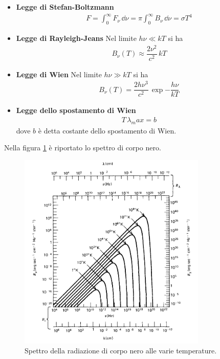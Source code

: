 \begin{itemize}
\item{\textbf{Legge di Stefan-Boltzmann}} \begin{align}
F = \int_0^{\infty} F_\nu \, \dd \nu = \pi \int_0^\infty B_\nu \, \dd \nu = \sigma T^4
\end{align}
\item{\textbf{Legge di Rayleigh-Jeans}} Nel limite $h\nu \ll kT$ si ha
\begin{align}
B_\nu(T) \approx \dfrac{2\nu^2}{c^2}\, kT
\end{align}
\item{\textbf{Legge di Wien}} Nel limite $h\nu \gg kT$ si ha
\begin{align}
B_\nu (T) = \dfrac{2h\nu^3}{c^2} \, \exp{-\dfrac{h\nu}{kT}}
\end{align}
\item{\textbf{Legge dello spostamento di Wien}}
\begin{align}
T\, \lambda_max = b
\end{align}
dove $b$ è detta costante dello spostamento di Wien.
\end{itemize}
Nella figura \ref{fig:Planck} è riportato lo spettro di corpo nero.
\begin{figure}
\begin{center}
\includegraphics[width=0.8\textwidth]{img/Spettro_di_Planck}
\caption{Spettro della radiazione di corpo nero alle varie temperature.} \label{fig:Planck}
\end{center}
\end{figure}

